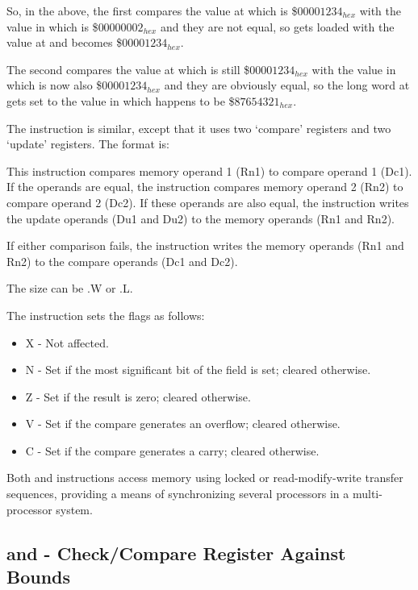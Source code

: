 So, in the above, the first  compares the value at   which is \$$00001234_{hex}$ with the value in  which is \$$00000002_{hex}$ and they are not equal, so  gets loaded with the value at  and becomes \$$00001234_{hex}$.

The second  compares the value at  which is still \$$00001234_{hex}$ with the value in  which is now also \$$00001234_{hex}$ and they are obviously equal, so the long word at  gets set to the value in  which happens to be \$$87654321_{hex}$.

The  instruction is similar, except that it uses two `compare' registers and two `update' registers. The format is:


This instruction compares memory operand 1 (Rn1) to compare operand 1 (Dc1). If the operands are equal, the instruction compares memory operand 2 (Rn2) to compare operand 2 (Dc2). If these operands are also equal, the instruction writes the update
operands (Du1 and Du2) to the memory operands (Rn1 and Rn2). 

If either comparison fails, the instruction writes the memory operands (Rn1 and Rn2) to the compare operands (Dc1 and Dc2).

The size can be .W or .L.

The  instruction sets the flags as follows:

\begin{itemize}
	\item X - Not affected.
	\item N - Set if the most significant bit of the field is set; cleared otherwise.
	\item Z - Set if the result is zero; cleared otherwise.
	\item V - Set if the compare generates an overflow; cleared otherwise.
	\item C - Set if the compare generates a carry; cleared otherwise.
\end{itemize}

Both  and  instructions access memory using locked or read-modify-write transfer sequences, providing a means of synchronizing several processors in a multi-processor system.

\subsection{ and  - Check/Compare Register Against Bounds}

